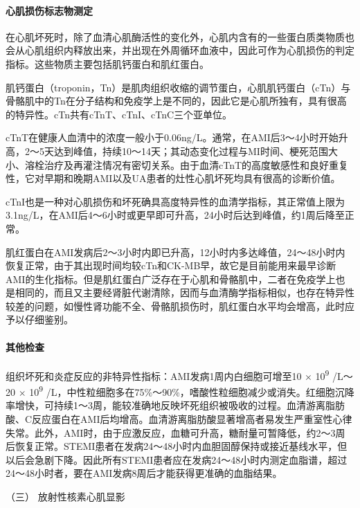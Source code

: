 \paragraph{心肌损伤标志物测定}

在心肌坏死时，除了血清心肌酶活性的变化外，心肌内含有的一些蛋白质类物质也会从心肌组织内释放出来，并出现在外周循环血液中，因此可作为心肌损伤的判定指标。这些物质主要包括肌钙蛋白和肌红蛋白。

肌钙蛋白（troponin，Tn）是肌肉组织收缩的调节蛋白，心肌肌钙蛋白（cTn）与骨骼肌中的Tn在分子结构和免疫学上是不同的，因此它是心肌所独有，具有很高的特异性。cTn共有cTnT、cTnI、cTnC三个亚单位。

cTnT在健康人血清中的浓度一般小于0.06ng/L。通常，在AMI后3～4小时开始升高，2～5天达到峰值，持续10～14天；其动态变化过程与MI时间、梗死范围大小、溶栓治疗及再灌注情况有密切关系。由于血清cTnT的高度敏感性和良好重复性，它对早期和晚期AMI以及UA患者的灶性心肌坏死均具有很高的诊断价值。

cTnI也是一种对心肌损伤和坏死确具高度特异性的血清学指标，其正常值上限为3.1ng/L，在AMI后4～6小时或更早即可升高，24小时后达到峰值，约1周后降至正常。

肌红蛋白在AMI发病后2～3小时内即已升高，12小时内多达峰值，24～48小时内恢复正常，由于其出现时间均较cTn和CK-MB早，故它是目前能用来最早诊断AMI的生化指标。但是肌红蛋白广泛存在于心肌和骨骼肌中，二者在免疫学上也是相同的，而且又主要经肾脏代谢清除，因而与血清酶学指标相似，也存在特异性较差的问题，如慢性肾功能不全、骨骼肌损伤时，肌红蛋白水平均会增高，此时应予以仔细鉴别。

\paragraph{其他检查}

组织坏死和炎症反应的非特异性指标：AMI发病1周内白细胞可增至10 ×
10\textsuperscript{9} /L～20 × 10\textsuperscript{9}
/L，中性粒细胞多在75\%～90\%，嗜酸性粒细胞减少或消失。红细胞沉降率增快，可持续1～3周，能较准确地反映坏死组织被吸收的过程。血清游离脂肪酸、C反应蛋白在AMI后均增高。血清游离脂肪酸显著增高者易发生严重室性心律失常。此外，AMI时，由于应激反应，血糖可升高，糖耐量可暂降低，约2～3周后恢复正常。STEMI患者在发病24～48小时内血胆固醇保持或接近基线水平，但以后会急剧下降。因此所有STEMI患者应在发病24～48小时内测定血脂谱，超过24～48小时者，要在AMI发病8周后才能获得更准确的血脂结果。

\hypertarget{text00312.htmlux5cux23CHP10-8-2-2-2-3}{}
（三） 放射性核素心肌显影

